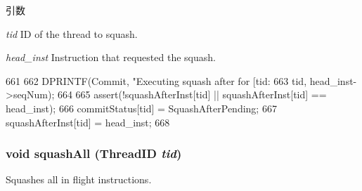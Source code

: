 \begin{DoxyParams}{引数}
\item[{\em tid}]ID of the thread to squash. \item[{\em head\_\-inst}]Instruction that requested the squash. \end{DoxyParams}



\begin{DoxyCode}
661 {
662     DPRINTF(Commit, "Executing squash after for [tid:%
663             tid, head_inst->seqNum);
664 
665     assert(!squashAfterInst[tid] || squashAfterInst[tid] == head_inst);
666     commitStatus[tid] = SquashAfterPending;
667     squashAfterInst[tid] = head_inst;
668 }
\end{DoxyCode}
\hypertarget{classDefaultCommit_a9aa66ed2ab2c61003cbbc4f0cbb53a13}{
\subsubsection[{squashAll}]{\setlength{\rightskip}{0pt plus 5cm}void squashAll ({\bf ThreadID} {\em tid})}}
\label{classDefaultCommit_a9aa66ed2ab2c61003cbbc4f0cbb53a13}
Squashes all in flight instructions. 



